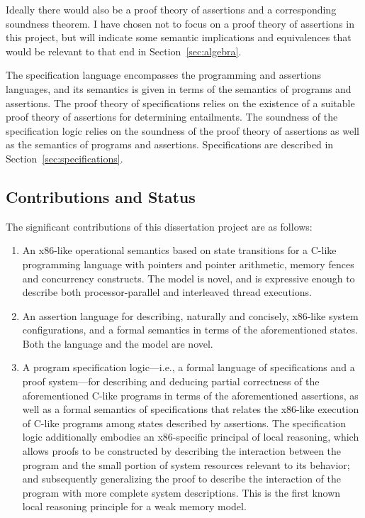 \documentclass[11pt]{report}
\begin{document}
Ideally there would also be a proof theory of assertions and a corresponding soundness theorem. I have chosen not to focus on a proof theory of assertions in this project, but will indicate some semantic implications and equivalences that would be relevant to that end in Section~\ref{sec:algebra}.

The specification language encompasses the programming and assertions languages, and its semantics is given in terms of the semantics of programs and assertions. The proof theory of specifications relies on the existence of a suitable proof theory of assertions for determining entailments. The soundness of the specification logic relies on the soundness of the proof theory of assertions as well as the semantics of programs and assertions. Specifications are described in Section~\ref{sec:specifications}.

\subsection{Contributions and Status}

The significant contributions of this dissertation project are as follows:

\begin{enumerate}
  \item An x86-like operational semantics based on state transitions for a C-like programming language with pointers and pointer arithmetic, memory fences and concurrency constructs. The model is novel, and is expressive enough to describe both processor-parallel and interleaved thread executions. 

  \item An assertion language for describing, naturally and concisely, x86-like system configurations, and a formal semantics in terms of the aforementioned states. Both the language and the model are novel. 

  \item A program specification logic---i.e., a formal language of specifications and a proof system---for describing and deducing partial correctness of the aforementioned C-like programs in terms of the aforementioned assertions, as well as a formal semantics of specifications that relates the x86-like execution of C-like programs among states described by assertions. The specification logic additionally embodies an x86-specific principal of local reasoning, which allows proofs to be constructed by describing the interaction between the program and the small portion of system resources relevant to its behavior; and subsequently generalizing the proof to describe the interaction of the program with more complete system descriptions. This is the first known local reasoning principle for a weak memory model. 
\end{enumerate}
\end{document}
